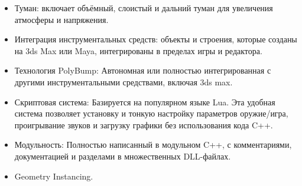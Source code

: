 \begin{itemize}
	\item Туман: включает объёмный, слоистый и дальний туман для увеличения атмосферы и напряжения.
	\item Интеграция инструментальных средств: объекты и строения, которые созданы на 3ds Max или Maya, интегрированы в пределах игры и редактора.
	\item Технология PolyBump: Автономная или полностью интегрированная с другими инструментальными средствами, включая 3ds max.
	\item Скриптовая система: Базируется на популярном языке Lua. Эта удобная система позволяет установку и тонкую настройку параметров оружие/игра, проигрывание звуков и загрузку графики без использования кода C++.
	\item Модульность: Полностью написанный в модульном C++, с комментариями, документацией и разделами в множественных DLL-файлах.
	\item 	Geometry Instancing. 
\end{itemize}
